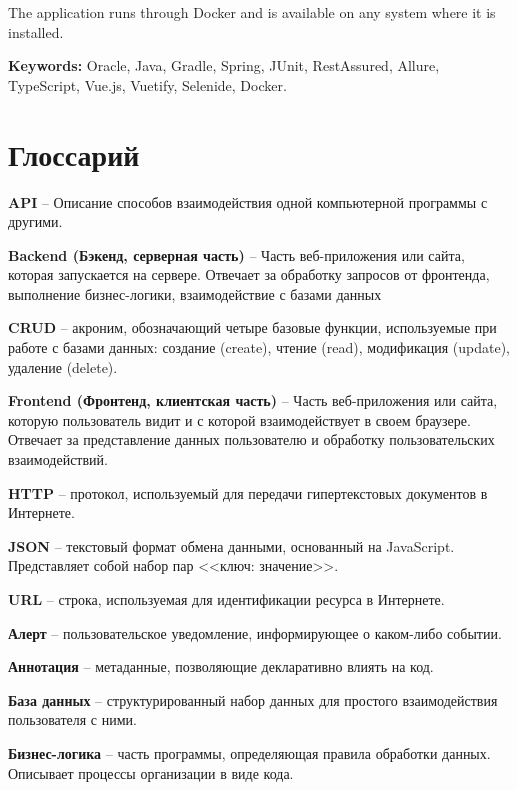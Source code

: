 \documentclass[a4paper,article]{article}
\begin{document}
\begin{sloppypar}
    The application runs through Docker and is available on any system where it is installed.

    \textbf{Keywords:} Oracle, Java, Gradle, Spring, JUnit, RestAssured, Allure, TypeScript, Vue.js, Vuetify, Selenide, Docker.
    

    \newpage

    \section*{Глоссарий}

    \textbf{API} -- Описание способов взаимодействия одной компьютерной программы с другими.

    \textbf{Backend (Бэкенд, серверная часть)} -- Часть веб-приложения или сайта, которая запускается на сервере. Отвечает за обработку запросов от фронтенда, выполнение бизнес-логики, взаимодействие с базами данных

    \textbf{CRUD} -- акроним, обозначающий четыре базовые функции, используемые при работе с базами данных: создание (create), чтение (read), модификация (update), удаление (delete).

    \textbf{Frontend (Фронтенд, клиентская часть)} -- Часть веб-приложения или сайта, которую пользователь видит и с которой взаимодействует в своем браузере. Отвечает за представление данных пользователю и обработку пользовательских взаимодействий.

    \textbf{HTTP} -- протокол, используемый для передачи гипертекстовых документов в Интернете.

    \textbf{JSON} -- текстовый формат обмена данными, основанный на JavaScript. Представляет собой набор пар <<ключ: значение>>.

    \textbf{URL} -- строка, используемая для идентификации ресурса в Интернете.

    \textbf{Алерт} -- пользовательское уведомление, информирующее о каком-либо событии.

    \textbf{Аннотация} -- метаданные, позволяющие декларативно влиять на код.

    \textbf{База данных} -- структурированный набор данных для простого взаимодействия пользователя с ними.

    \textbf{Бизнес-логика} -- часть программы, определяющая правила обработки данных. Описывает процессы организации в виде кода.


\end{sloppypar}
\end{document}
